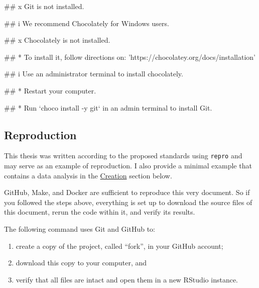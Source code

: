 \documentclass[12pt,a4paper,twoside]{article}
\providecommand{\tightlist}{%
  \setlength{\itemsep}{0pt}\setlength{\parskip}{0pt}}
\let\oldverbatim\verbatim
\let\endoldverbatim\endverbatim
\renewenvironment{verbatim}{\footnotesize\oldverbatim}{\endoldverbatim}
\begin{document}
\begin{verbatim}
## x Git is not installed.
\end{verbatim}

\begin{verbatim}
## i We recommend Chocolately for Windows users.
\end{verbatim}

\begin{verbatim}
## x Chocolately is not installed.
\end{verbatim}

\begin{verbatim}
## * To install it, follow directions on: 'https://chocolatey.org/docs/installation'
\end{verbatim}

\begin{verbatim}
## i Use an administrator terminal to install chocolately.
\end{verbatim}

\begin{verbatim}
## * Restart your computer.
\end{verbatim}

\begin{verbatim}
## * Run `choco install -y git` in an admin terminal to install Git.
\end{verbatim}

\hypertarget{reproduction}{%
\subsection{Reproduction}\label{reproduction}}

This thesis was written according to the proposed standards using \texttt{repro} and may serve as an example of reproduction.
I also provide a minimal example that contains a data analysis in the \protect\hyperlink{creation}{Creation} section below.

GitHub, Make, and Docker are sufficient to reproduce this very document.
So if you followed the steps above, everything is set up to download the source files of this document, rerun the code within it, and verify its results.

The following command uses Git and GitHub to:

\begin{enumerate}
\def\labelenumi{\arabic{enumi}.}
\tightlist
\item
  create a copy of the project, called ``fork'', in your GitHub account;
\item
  download this copy to your computer, and
\item
  verify that all files are intact and open them in a new RStudio instance.
\end{enumerate}
\end{document}

